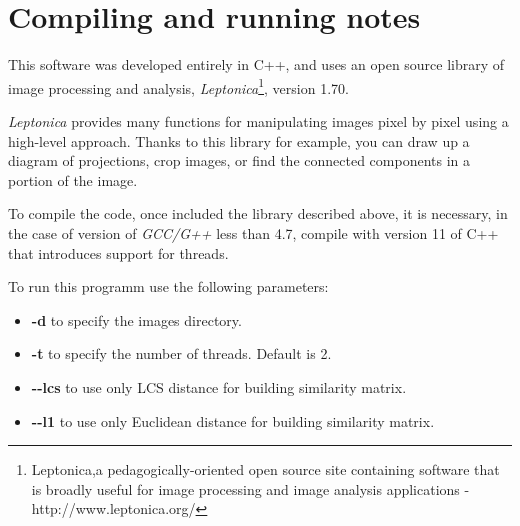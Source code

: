 \section{Compiling and running notes}

This software was developed entirely in C++, and uses an open source library of image processing and analysis, \emph{Leptonica}\footnote{Leptonica,a pedagogically-oriented open source site containing software that is broadly useful for image processing and image analysis applications -http://www.leptonica.org/}, version 1.70.

\emph{Leptonica} provides many functions for manipulating images pixel by pixel using a high-level approach. Thanks to this library for example, you can draw up a diagram of projections, crop images, or find the connected components in a portion of the image.

To compile the code, once included the library described above, it is necessary, in the case of version of \emph{GCC/G++} less than 4.7, compile with version 11 of C++ that introduces support for threads.

To run this programm use the following parameters:
\begin{itemize}
\item \textbf{-d} to specify the images directory.
\item \textbf{-t} to specify the number of threads. Default is 2.
\item \textbf{-\--lcs} to use only LCS distance for building similarity matrix.
\item \textbf{-\--l1} to use only Euclidean distance for building similarity matrix.
\end{itemize}